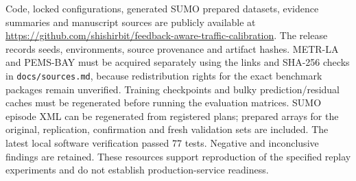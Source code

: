 Code, locked configurations, generated SUMO prepared datasets, evidence summaries and manuscript sources are publicly available at \url{https://github.com/shishirbit/feedback-aware-traffic-calibration}. The release records seeds, environments, source provenance and artifact hashes. METR-LA and PEMS-BAY must be acquired separately using the links and SHA-256 checks in \texttt{docs/sources.md}, because redistribution rights for the exact benchmark packages remain unverified. Training checkpoints and bulky prediction/residual caches must be regenerated before running the evaluation matrices. SUMO episode XML can be regenerated from registered plans; prepared arrays for the original, replication, confirmation and fresh validation sets are included. The latest local software verification passed 77 tests. Negative and inconclusive findings are retained. These resources support reproduction of the specified replay experiments and do not establish production-service readiness.